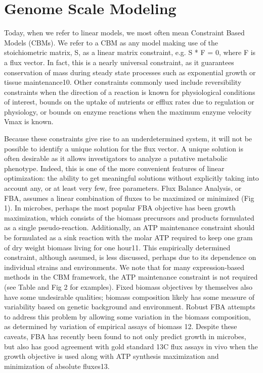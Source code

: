 \documentclass[phd,tocprelim]{cornell}
\begin{document}
\section{Genome Scale Modeling}
Today, when we refer to linear models, we most often mean Constraint
Based Models (CBMs). We refer to a CBM as any model making use of the
stoichiometric matrix, S, as a linear matrix constraint, e.g. S * F =
0, where F is a flux vector. In fact, this is a nearly universal
constraint, as it guarantees conservation of mass during steady state
processes such as exponential growth or tissue maintenance10. Other
constraints commonly used include reversibility constraints when the
direction of a reaction is known for physiological conditions of
interest, bounds on the uptake of nutrients or efflux rates due to
regulation or physiology, or bounds on enzyme reactions when the
maximum enzyme velocity Vmax is known.

Because these constraints give rise to an underdetermined system, it
will not be possible to identify a unique solution for the flux
vector. A unique solution is often desirable as it allows
investigators to analyze a putative metabolic phenotype. Indeed, this
is one of the more convenient features of linear optimization: the
ability to get meaningful solutions without explicitly taking into
account any, or at least very few, free parameters.  Flux Balance
Analysis, or FBA, assumes a linear combination of fluxes to be
maximized or minimized (Fig 1). In microbes, perhaps the most popular
FBA objective has been growth maximization, which consists of the
biomass precursors and products formulated as a single
pseudo-reaction. Additionally, an ATP maintenance constraint should be
formulated as a sink reaction with the molar ATP required to keep one
gram of dry weight biomass living for one hour11. This empirically
determined constraint, although assumed, is less discussed, perhaps
due to its dependence on individual strains and environments.  We note
that for many expression-based methods in the CBM framework, the ATP
maintenance constraint is not required (see Table and Fig 2 for
examples). Fixed biomass objectives by themselves also have some
undesirable qualities; biomass composition likely has some measure of
variability based on genetic background and environment.  Robust FBA
attempts to address this problem by allowing some variation in the
biomass composition, as determined by variation of empirical assays of
biomass 12.  Despite these caveats, FBA has recently been found to not
only predict growth in microbes, but also has good agreement with gold
standard 13C flux assays in vivo when the growth objective is used
along with ATP synthesis maximization and minimization of absolute
fluxes13.
\end{document}
